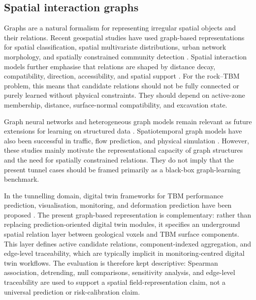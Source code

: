\subsection{Spatial interaction graphs}
Graphs are a natural formalism for representing irregular spatial objects and
their relations. Recent geospatial studies have used graph-based
representations for spatial classification, spatial multivariate
distributions, urban network morphology, and spatially constrained community
detection
\citep{zhu2020spatial,desabbata2023graph,liu2025urban,chen2026usgt}. Spatial
interaction models further emphasise that relations are shaped by distance
decay, compatibility, direction, accessibility, and spatial support
\citep{wilson1971spatial,fotheringham1989spatial}. For the rock--TBM problem,
this means that candidate relations should not be fully connected or purely
learned without physical constraints. They should depend on active-zone
membership, distance, surface-normal compatibility, and excavation state.

Graph neural networks and heterogeneous graph models remain relevant as future
extensions for learning on structured data
\citep{schlichtkrull2018modeling,zhang2019heterogeneous,wu2020comprehensive,zhou2020graph}.
Spatiotemporal graph models have also been successful in traffic, flow
prediction, and physical simulation
\citep{li2018diffusion,wu2019graph,zhang2020deep,geng2019spatiotemporal,sanchez2020learning,pfaff2021learning}.
However, these studies mainly motivate the representational capacity of graph
structures and the need for spatially constrained relations. They do not imply
that the present tunnel cases should be framed primarily as a black-box
graph-learning benchmark.

In the tunnelling domain, digital twin frameworks for TBM performance
prediction, visualisation, monitoring, and deformation prediction have been
proposed \citep{latif2023digital,apoji2023shaping,hu2025dataknowledge}. The
present graph-based representation is complementary: rather than replacing
prediction-oriented digital twin modules, it specifies an underground spatial
relation layer between geological voxels and TBM surface components. This layer
defines active candidate relations, component-indexed aggregation, and
edge-level traceability, which are typically implicit in monitoring-centred
digital twin workflows. The evaluation is therefore kept descriptive:
Spearman association, detrending, null comparisons, sensitivity analysis, and
edge-level traceability are used to support a spatial field-representation
claim, not a universal prediction or risk-calibration claim.
